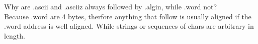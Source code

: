 \documentclass{article}
\begin{document}
\noindent Why are .ascii and .asciiz always followed by .algin, while .word not?\\
Because .word are  4 bytes, therfore anything that follow is usually aligned if the .word
address is well aligned. While strings or sequences of chars are arbitrary in length.
\end{document}
